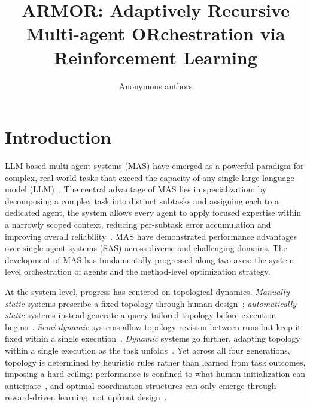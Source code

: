 \documentclass{article} %
\title{ARMOR: Adaptively Recursive Multi-agent ORchestration via Reinforcement Learning}
\author{Anonymous authors}
\begin{document}
\maketitle

\begin{abstract}
\end{abstract}

\section{Introduction}
\label{sec:intro}

LLM-based multi-agent systems (MAS) have emerged as a powerful paradigm for
complex, real-world tasks that exceed the capacity of any single large language model (LLM)~\citep{%
fourney2024magentic,wang2025mas2,zhang2026metaagentx}.
The central advantage of MAS lies in specialization: by decomposing a complex
task into distinct subtasks and assigning each to a dedicated agent, the system
allows every agent to apply focused expertise within a narrowly scoped context,
reducing per-subtask error accumulation and improving overall
reliability~\citep{wang2025mas2,lin2024think}.
MAS have demonstrated performance advantages over single-agent
systems (SAS) across diverse and challenging domains.
The development of MAS has fundamentally progressed along two axes:
the system-level orchestration of agents and the method-level optimization strategy.

At the system level, progress has centered on topological dynamics.
\emph{Manually static} systems prescribe a fixed topology through human
design~\citep{fourney2024magentic,chen2023autoagents}; \emph{automatically
static} systems instead generate a query-tailored topology before execution
begins~\citep{zhuge2024gptswarm,zhang2024gdesigner,gao2025flowreasoner,%
nielsen2026conductor,zhang2026metaagentx}.
\emph{Semi-dynamic} systems allow topology revision between runs but keep it
fixed within a single
execution~\citep{chen2024agentverse,hu2025evomac,wang2026metagen,%
wang2026agentconductor,wang2025mas2}.
\emph{Dynamic} systems go further, adapting topology within a single execution
as the task unfolds~\citep{dang2026multi,jiang2026agentqmix,wang2025tdag}.
Yet across all four generations, topology is determined by heuristic rules rather
than learned from task outcomes, imposing a hard ceiling: performance is confined
to what human initialization can anticipate~\citep{hu2025evomac}, and optimal
coordination structures can only emerge through reward-driven learning,
not upfront design~\citep{nielsen2026conductor}.
\end{document}
